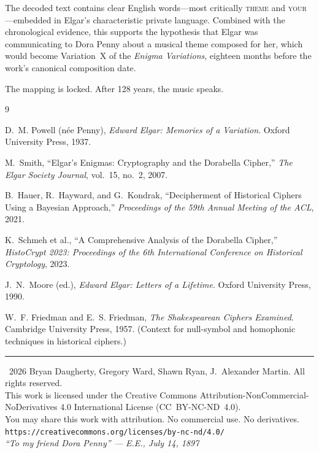 \documentclass[12pt,a4paper]{article}
\begin{document}
The decoded text contains clear English words---most critically \textsc{theme} and \textsc{your}---embedded in Elgar's characteristic private language. Combined with the chronological evidence, this supports the hypothesis that Elgar was communicating to Dora Penny about a musical theme composed for her, which would become Variation~X of the \textit{Enigma Variations}, eighteen months before the work's canonical composition date.

The mapping is locked. After 128 years, the music speaks.


\begin{thebibliography}{9}

D.~M. Powell (n\'{e}e Penny),
\textit{Edward Elgar: Memories of a Variation}.
Oxford University Press, 1937.

M.~Smith,
``Elgar's Enigmas: Cryptography and the Dorabella Cipher,''
\textit{The Elgar Society Journal}, vol.~15, no.~2, 2007.

B.~Hauer, R.~Hayward, and G.~Kondrak,
``Decipherment of Historical Ciphers Using a Bayesian Approach,''
\textit{Proceedings of the 59th Annual Meeting of the ACL}, 2021.

K.~Schmeh et al.,
``A Comprehensive Analysis of the Dorabella Cipher,''
\textit{HistoCrypt 2023: Proceedings of the 6th International Conference on Historical Cryptology}, 2023.

J.~N.~Moore (ed.),
\textit{Edward Elgar: Letters of a Lifetime}.
Oxford University Press, 1990.

W.~F. Friedman and E.~S. Friedman,
\textit{The Shakespearean Ciphers Examined}.
Cambridge University Press, 1957.
(Context for null-symbol and homophonic techniques in historical ciphers.)

\end{thebibliography}

\vfill
\noindent\rule{\textwidth}{0.4pt}

\begin{center}
\small
\textcopyright\ 2026 Bryan Daugherty, Gregory Ward, Shawn Ryan, J.~Alexander Martin. All rights reserved.\\[4pt]
This work is licensed under the Creative Commons Attribution-NonCommercial-NoDerivatives 4.0 International License (CC~BY-NC-ND~4.0).\\
You may share this work with attribution. No commercial use. No derivatives.\\[4pt]
\texttt{https://creativecommons.org/licenses/by-nc-nd/4.0/}\\[8pt]
\textit{``To my friend Dora Penny'' --- E.E., July 14, 1897}
\end{center}
\end{document}
